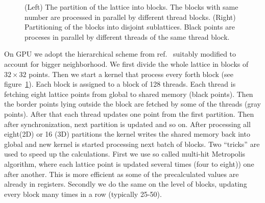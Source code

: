 \documentclass[a4paper]{llncs}
\begin{document}
\begin{figure}
\begin{center}
\end{center}
\caption{\label{fig:nn} (Left) The partition of the lattice into
  blocks. The blocks with same number are processed in parallel by
  different thread blocks.  (Right) Partitioning of the blocks into
  disjoint sublattices. Black points are proceses in parallel by
  different threads of the same thread block.}
\end{figure}


On GPU we adopt the hierarchical scheme from ref.~\cite{weigel}
suitably modified to account for bigger neighborhood.  We first divide
the whole lattice in blocks of $32\times 32$ points. Then we start a
kernel that process every forth block (see figure~\ref{fig:nn}).  Each
block is assigned to a block of 128 threads. Each thread is fetching
eight lattice points from global to shared memory (black points). Then
the border points lying outside the block are fetched by some of the
threads (gray points).  After that each thread updates
one point from the first partition. Then after synchronization, next
partition is updated and so on. After processing all eight(2D) or 16
(3D) partitions the kernel writes the shared memory back into global
and new kernel is started processing next batch of blocks.  Two
``tricks'' are used to speed up the calculations. First we use so
called multi-hit Metropolis algorithm, where each lattice point is
updated several times (four to eight)) one after another. This is more
efficient as some of the precalculated values are already in
registers. Secondly we do the same on the level of blocks, updating
every block many times in a row (typically 25-50). 
\end{document}
